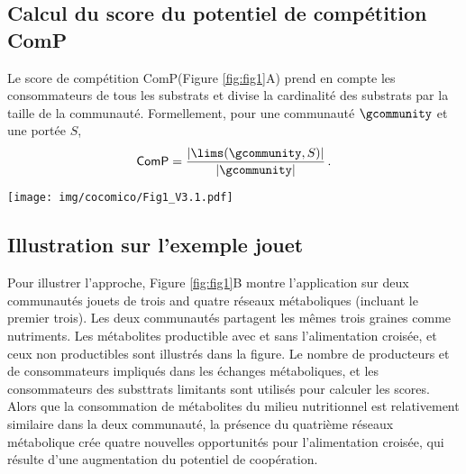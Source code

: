 \subsection{Calcul du score du potentiel de  compétition \textsf{ComP}} Le score de compétition \textsf{ComP}(Figure \ref{fig:fig1}A) prend en compte les consommateurs de tous les substrats \lims et divise la cardinalité des substrats \lims par la taille de la communauté. Formellement, pour une communauté  $\gcommunity$ et une portée $S$,
\[
    \textsf{ComP} = \frac{\vert\lims(\gcommunity,S)\vert}{\vert \gcommunity \vert} \,.
\]


\begin{figure*}
    \centering
    \texttt{[image: img/cocomico/Fig1\_V3.1.pdf]}
    \caption{\textbf{Overview of the method and illustration on toy examples.}
    (\textbf{A.}) Identifying exchanges and computing scores.
    The community is represented by a collection of metabolic networks and the description of the environment. Reasoning in Answer Set Programming permits modelling a network expansion-based model of producibility together with the putative exchanges of metabolites, limiting substrates, metabolite producibility and consumption by species.
    These are used to compute the cooperation potential (\textsf{CooP})
    and the competition potential (\textsf{ComP}) of the community.
    (\textbf{B.}) Illustration on two toy communities.
    Producible metabolites from the initial environment and from interactions with other species
    are used to compute \textsf{CooP} and \textsf{ComP}.}
    \label{fig:fig1}
\end{figure*}

\subsection{Illustration sur l'exemple jouet} Pour illustrer l'approche, Figure \ref{fig:fig1}B montre l'application sur deux communautés jouets de trois and quatre réseaux métaboliques (incluant le premier trois). Les deux communautés partagent les mêmes trois graines comme nutriments. Les métabolites productible avec et sans l'alimentation croisée, et ceux non productibles sont illustrés dans la figure. Le nombre de producteurs et de consommateurs impliqués dans les échanges métaboliques, et les consommateurs des substtrats limitants sont utilisés pour calculer les scores. Alors que la consommation de métabolites du milieu nutritionnel est relativement similaire dans la deux communauté, la présence du quatrième réseaux métabolique crée quatre nouvelles opportunités pour l'alimentation croisée, qui résulte d'une augmentation du potentiel de coopération.

